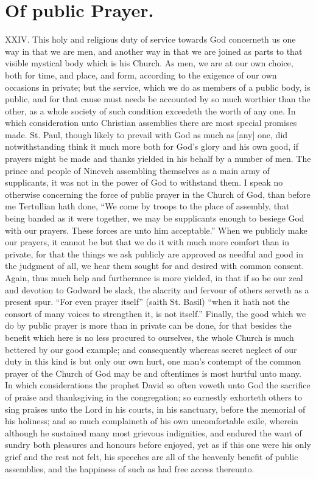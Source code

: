 \section*{Of public Prayer.}
XXIV. This holy and religious duty of service towards God concerneth us one way in that we are men, and another  way in that we are joined as parts to that visible mystical body which is his Church. As men, we are at our own choice, both for time, and place, and form, according to the exigence of our own occasions in private; but the service, which we do as members of a public body, is public, and for that cause must needs be accounted by so much worthier than the other, as a whole society of such condition exceedeth the worth of any one. In which consideration unto Christian assemblies there are most special promises made. St. Paul, though likely to prevail with God as much as [any] one, did notwithstanding think it much more both for God’s glory and his own good, if prayers might be made and thanks yielded in his behalf by a number of men. The prince and people of Nineveh assembling themselves as a main army of supplicants, it was not in the power of God to withstand them. I speak no otherwise concerning the force of public prayer in the Church of God, than before me Tertullian hath done, “We come by troops to the place of assembly, that being banded as it were together, we may be supplicants enough to besiege God with our prayers. These forces are unto him acceptable.”
When we publicly make our prayers, it cannot be but that we do it with much more comfort than in private, for that the things we ask publicly are approved as needful and good in the judgment of all, we hear them sought for and desired with common consent. Again, thus much help and furtherance is more yielded, in that if so be our zeal and devotion to Godward be slack, the alacrity and fervour of others serveth as a present spur. “For even prayer itself” (saith St. Basil) “when it hath not the consort of many voices to strengthen it, is not itself.” Finally, the good which we do  by public prayer is more than in private can be done, for that besides the benefit which here is no less procured to ourselves, the whole Church is much bettered by our good example; and consequently whereas secret neglect of our duty in this kind is but only our own hurt, one man’s contempt of the common prayer of the Church of God may be and oftentimes is most hurtful unto many. In which considerations the prophet David so often voweth unto God the sacrifice of praise and thanksgiving in the congregation; so earnestly exhorteth others to sing praises unto the Lord in his courts, in his sanctuary, before the memorial of his holiness; and so much complaineth of his own uncomfortable exile, wherein although he sustained many most grievous indignities, and endured the want of sundry both pleasures and honours before enjoyed, yet as if this one were his only grief and the rest not felt, his speeches are all of the heavenly benefit of public assemblies, and the happiness of such as had free access thereunto.

